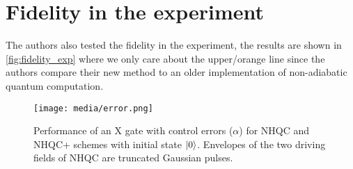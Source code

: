 \documentclass[%
reprint,
amsmath,amssymb,
aps,
]{revtex4-2}
\begin{document}
\section{Fidelity in the experiment}
\label{sec:FidelityExp}
The authors also tested the fidelity in the experiment, the results are shown in 
\autoref{fig:fidelity_exp} where we only care about the upper/orange line since the authors compare
their new method to an older implementation of non-adiabatic quantum computation.

\begin{figure}
  \centering
  \texttt{[image: media/error.png]}
  \caption{Performance of an X gate with control errors ($\alpha$) for NHQC and
    NHQC+ schemes with initial state $\ket{0}$. Envelopes of the two
  driving ﬁelds of NHQC are truncated Gaussian pulses. }
  \label{fig:fidelity_exp}
\end{figure}

\nocite{*}

\end{document}
